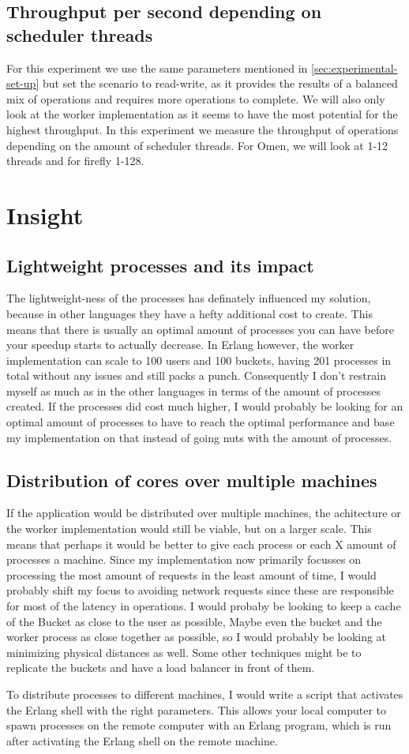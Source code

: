 \documentclass{article}
\begin{document}

\subsection{Throughput per second depending on scheduler threads}
For this experiment we use the same parameters mentioned in
\autoref{sec:experimental-set-up} but set the scenario to read-write, as it
provides the results of a balanced mix of operations and requires more
operations to complete. We will also only look at the worker implementation as
it seems to have the most potential for the highest throughput. In this experiment we measure the throughput of
operations depending on the amount of scheduler threads. For Omen, we will look
at 1-12 threads and for firefly 1-128.
\section{Insight}
\subsection{Lightweight processes and its impact}
The lightweight-ness of the processes has definately influenced my solution,
because in other languages they have a hefty additional cost to create. This
means that there is usually an optimal amount of processes you can have before
your speedup starts to actually decrease. In Erlang however, the
worker implementation can scale to 100 users and 100 buckets, having 201
processes in total without any issues and still packs a punch. Consequently
I don't restrain myself as much as in the other languages in terms of the amount of processes created.
If the processes did cost much higher, I would probably be looking for an
optimal amount of processes to have to reach the optimal performance and base my
implementation on that instead of going nuts with the amount of processes.
\subsection{Distribution of cores over multiple machines}
If the application would be distributed over multiple machines, the achitecture
or the worker implementation would still be viable, but on a larger scale. This
means that perhaps it would be better to give each process or each X amount of
processes a machine. Since my implementation now primarily focusses on
processing the most amount of requests in the least amount of time, I would
probably shift my focus to avoiding network requests since these are responsible
for most of the
latency in operations. I would probaby be looking to keep a cache of the Bucket
as close to the user as possible, Maybe even the bucket and the worker process
as close together as possible, so I would probably be looking at minimizing physical
distances as well. Some other techniques might be to replicate the buckets and have a
load balancer in front of them. \par
To distribute processes to different machines, I would write a script that
activates the Erlang shell with the right parameters. This allows your local
computer to spawn processes on the remote computer with an Erlang program, which
is run after activating the Erlang shell on the remote machine.
\end{document}
